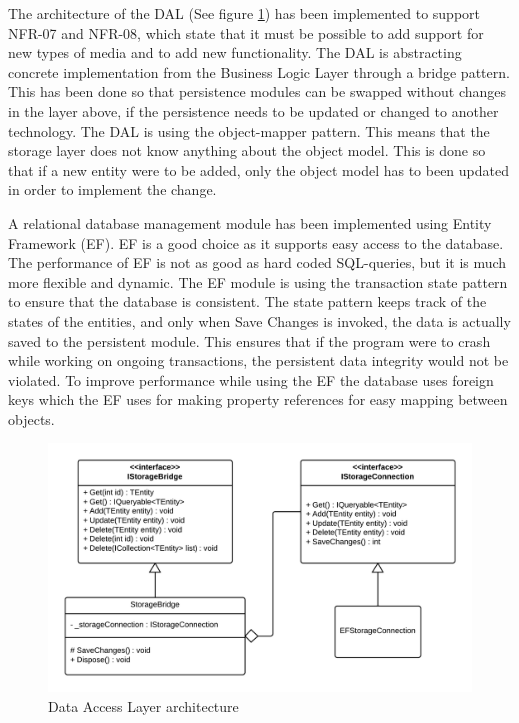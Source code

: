 \documentclass[../report.tex]{subfiles}
\begin{document}
\graphicspath{{img/}{../img/}}

The architecture of the DAL (See figure \ref{fig:DALclassdiagram}) has been implemented to support NFR-07 and NFR-08, which state that it must be possible to add support for new types of media and to add new functionality. The DAL is abstracting concrete implementation from the Business Logic Layer through a bridge pattern. This has been done so that persistence modules can be swapped without changes in the layer above, if the persistence needs to be updated or changed to another technology. The DAL is using the object-mapper pattern. This means that the storage layer does not know anything about the object model. This is done so that if a new entity were to be added, only the object model has to been updated in order to implement the change. 

A relational database management module has been implemented using Entity Framework (EF). EF is a good choice as it supports easy access to the database. The performance of EF is not as good as hard coded SQL-queries, but it is much more flexible and dynamic. The EF module is using the transaction state pattern to ensure that the database is consistent. The state pattern keeps track of the states of the entities, and only when Save Changes is invoked, the data is actually saved to the persistent module. This ensures that if the program were to crash while working on ongoing transactions, the persistent data integrity would not be violated. To improve performance while using the EF the database uses foreign keys which the EF uses for making property references for easy mapping between objects.

\begin{figure}[H]
\centering
\includegraphics[width=\linewidth]{DALclassdiagram.png}
\caption{Data Access Layer architecture}
\label{fig:DALclassdiagram}
\end{figure} 
\end{document}
